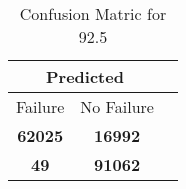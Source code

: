 \begin{table}[] 
\caption{Confusion Matric for 92.5} 
\label{Table: Prediction Accuracy-DMD92.5OnlySunEKF-ignoreReflectionEKF-top2-Reflection} 
\centering 
\begin{tabular} 
 {@{}ccc@{}} 
\toprule 
\multicolumn{2}{c}{\textbf{Predicted}}
 \\ \midrule 
\multicolumn{1}{|c|}{Failure} & 
\multicolumn{1}{c|}{No Failure}
 \\ \midrule 
\multicolumn{1}{|c|}{\color{green}\textbf{62025}} & 
\multicolumn{1}{c|}{\color{red}\textbf{16992}}
 \\ \midrule 
\multicolumn{1}{|c|}{\color{red}\textbf{49}} & 
\multicolumn{1}{c|}{\color{green}\textbf{91062}}
 \\ \bottomrule 
\end{tabular} 
\end{table} 
